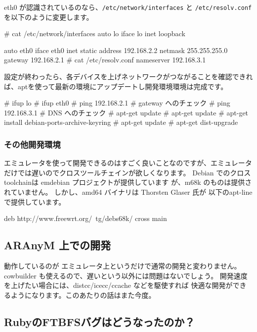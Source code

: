 \documentclass[mingoth,a4paper]{jsarticle}
\begin{document}
eth0 が認識されているのなら、\texttt{/etc/network/interfaces} と \texttt{/etc/resolv.conf} を以下のように変更します。

\begin{commandline}
# cat /etc/network/interfaces
auto lo
iface lo inet loopback

auto eth0
iface eth0 inet static
address 192.168.2.2
netmask 255.255.255.0
gateway 192.168.2.1
# cat /etc/resolv.conf
nameserver 192.168.3.1
\end{commandline}

設定が終わったら、各デバイスを上げネットワークがつながることを確認できれ
ば、aptを使って最新の環境にアップデートし開発環境環境は完成です。

\begin{commandline}
# ifup lo
# ifup eth0
# ping 192.168.2.1 # gateway へのチェック
# ping 192.168.3.1 # DNS へのチェック
# apt-get update   # apt-get update
# apt-get install debian-ports-archive-keyring
# apt-get update
# apt-get dist-upgrade
\end{commandline}

\subsubsection{その他開発環境}

エミュレータを使って開発できるのはすごく良いことなのですが、エミュレータ
だけでは遅いのでクロスツールチェインが欲しくなります。
Debian でのクロスtoolchainは emdebian プロジェクトが提供しています
が、m68k のものは提供されていません。
しかし、amd64 バイナリは Thorsten Glaser 氏が
以下のapt-line で提供しています。

\begin{commandline}
deb http://www.freewrt.org/~tg/debs68k/ cross main
\end{commandline}

\subsection{ARAnyM 上での開発}

動作しているのが エミュレータ上というだけで通常の開発と変わりません。
cowbuilder も使えるので、遅いという以外には問題はないでしょう。
開発速度を上げたい場合には、distcc/icecc/ccache などを駆使すれば
快適な開発ができるようになります。このあたりの話はまた今度。

\subsection{RubyのFTBFSバグはどうなったのか？}
\end{document}
